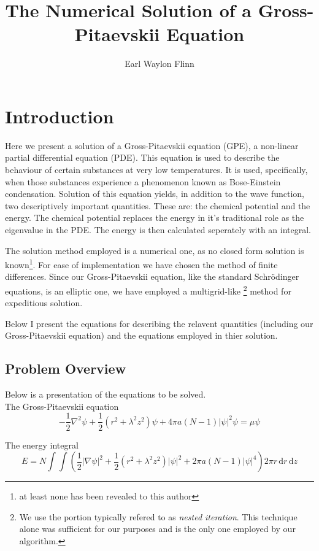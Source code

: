 \documentclass{article}
\title{The Numerical Solution of a Gross-Pitaevskii Equation}
\author{Earl Waylon Flinn}
\begin{document}
\maketitle
\section{Introduction}
Here we present a solution of a Gross-Pitaevskii equation (GPE), a non-linear
partial differential equation (PDE). This equation is
used to describe the behaviour of certain substances at very low temperatures.
It is used, specifically, when those substances experience a phenomenon known
as Bose-Einstein condensation. Solution of this equation yields, in addition to
the wave function, two descriptively important quantities. These are: the
chemical potential and the energy. The chemical potential replaces the energy
in it's traditional role as the eigenvalue in the PDE. The energy is then
calculated seperately with an integral.

The solution method employed is a numerical one, as no closed form solution is
known\footnote{at least none has been revealed to this author}. For ease of
implementation we have chosen the method of finite differences. Since our
Gross-Pitaevskii equation, like the standard Schr\"odinger
equations, is an elliptic one, we have employed a multigrid-like \footnote{
We use the portion typically refered to as \emph{nested iteration}. This
technique alone was sufficient for our purposes and is the only one employed
by our algorithm.} method for expeditious solution.


Below I present the equations for describing the relavent quantities (including
our Gross-Pitaevskii equation) and the equations employed in thier solution.

\subsection{Problem Overview}
Below is a presentation of the equations to be solved.\\

The Gross-Pitaevskii equation
\begin{equation}
- \frac{1}{2}  \nabla^{2} \psi +
\frac{1}{2} \left( r^{2} + \lambda^{2} z^{2} \right) \psi +
4 \pi a (N-1) \lvert \psi \rvert^{2} \psi = 
\mu \psi
\end{equation}

The energy integral
\begin{equation}
E = N \int \int \left(
	\frac{1}{2} \lvert \nabla \psi \rvert^{2} + 
	\frac{1}{2} \left( r^{2} + \lambda^{2} z^{2} \right) \lvert \psi \rvert^{2} +
	2 \pi a (N-1) \lvert \psi \rvert^{4}
	\right) 2 \pi r \, \mathrm{d} r \, \mathrm{d}z
\end{equation}
\end{document}
